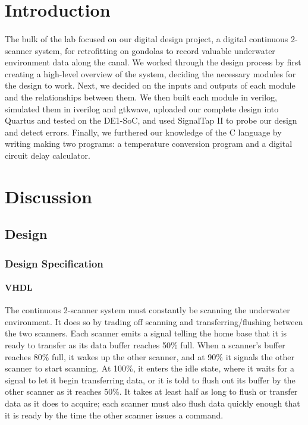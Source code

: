 \documentclass{article}
\begin{document}
\section{Introduction}
\paragraph{} The bulk of the lab focused on our digital design project, a digital continuous 2-scanner system, for retrofitting on gondolas to record valuable underwater environment data along the canal. We worked through the design process by first creating a high-level overview of the system, deciding the necessary modules for the design to work. Next, we decided on the inputs and outputs of each module and the relationships between them. We then built each module in verilog, simulated them in iverilog and gtkwave, uploaded our complete design into Quartus and tested on the DE1-SoC, and used SignalTap II to probe our design and detect errors. Finally, we furthered our knowledge of the C language by writing making two programs: a temperature conversion program and a digital circuit delay calculator. 


\section{Discussion}
\subsection{Design}
  \subsubsection{Design Specification}
  \paragraph{VHDL} The continuous 2-scanner system must constantly be scanning the underwater environment. It does so by trading off scanning and transferring/flushing between the two scanners. Each scanner emits a signal telling the home base that it is ready to transfer as its data buffer reaches 50\% full. When a scanner’s buffer reaches 80\% full, it wakes up the other scanner, and at 90\% it signals the other scanner to start scanning. At 100\%, it enters the idle state, where it waits for a signal to let it begin transferring data, or it is told to flush out its buffer by the other scanner as it reaches 50\%. It takes at least half as long to flush or transfer data as it does to acquire; each scanner must also flush data quickly enough that it is ready by the time the other scanner issues a command.
\end{document}
